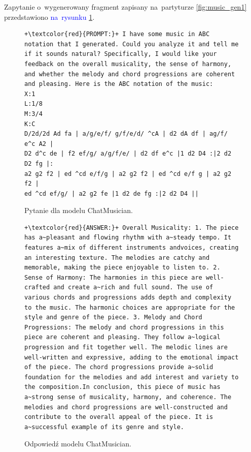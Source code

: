 \documentclass[data-science]{agh-wi} %
\begin{document}
Zapytanie o~wygenerowany fragment zapisany na~partyturze \ref*{fig:music_gen1} przedstawiono \textcolor{blue}{na~rysunku} \ref*{code:chat_prompt1}.

\begin{figure}[ht!]
    \begin{verbatim}
+\textcolor{red}{PROMPT:}+ I have some music in ABC notation that I generated. Could you analyze it and tell me if it sounds natural? Specifically, I would like your feedback on the overall musicality, the sense of harmony, and whether the melody and chord progressions are coherent and pleasing. Here is the ABC notation of the music:
X:1
L:1/8
M:3/4
K:C
D/2d/2d Ad fa | a/g/e/f/ g/f/e/d/ ^cA | d2 dA df | ag/f/ e^c A2 | 
D2 d^c de | f2 ef/g/ a/g/f/e/ | d2 df e^c |1 d2 D4 :|2 d2 D2 fg |:
a2 g2 f2 | ed ^cd e/f/g | a2 g2 f2 | ed ^cd e/f g | a2 g2 f2 | 
ed ^cd ef/g/ | a2 g2 fe |1 d2 de fg :|2 d2 D4 ||
    \end{verbatim}
    \caption{Pytanie dla modelu ChatMusician.}\label{code:chat_prompt1}
\end{figure}

\begin{figure}[ht!]
    \begin{verbatim}
+\textcolor{red}{ANSWER:}+ Overall Musicality: 1. The piece has a~pleasant and flowing rhythm with a~steady tempo. It features a~mix of different instruments andvoices, creating an interesting texture. The melodies are catchy and memorable, making the piece enjoyable to listen to. 2. Sense of Harmony: The harmonies in this piece are well-crafted and create a~rich and full sound. The use of various chords and progressions adds depth and complexity to the music. The harmonic choices are appropriate for the style and genre of the piece. 3. Melody and Chord Progressions: The melody and chord progressions in this piece are coherent and pleasing. They follow a~logical progression and fit together well. The melodic lines are well-written and expressive, adding to the emotional impact of the piece. The chord progressions provide a~solid foundation for the melodies and add interest and variety to the composition.In conclusion, this piece of music has a~strong sense of musicality, harmony, and coherence. The melodies and chord progressions are well-constructed and contribute to the overall appeal of the piece. It is a~successful example of its genre and style.
    \end{verbatim}
    \caption{Odpowiedź modelu ChatMusician.}\label{code:chat_answer1}
\end{figure}
\end{document}
